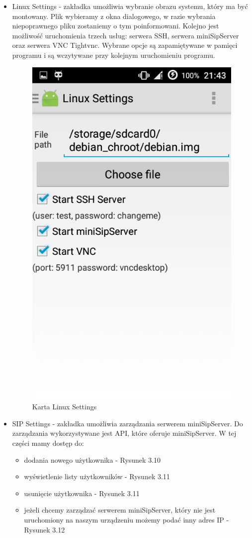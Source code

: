 \begin{itemize}
	\item Linux Settings - zakładka umożliwia wybranie obrazu systemu, który ma być montowany. Plik wybieramy z okna dialogowego, w razie wybrania niepoprawnego pliku zostaniemy o tym poinformowani. Kolejno jest możliwość uruchomienia trzech usług: serwera SSH, serwera miniSipServer oraz serwera VNC Tightvnc. Wybrane opcje są zapamiętywane w pamięci programu i są wczytywane przy kolejnym uruchomieniu programu.
	
    \begin{figure}[H]
\centering
\includegraphics[width=0.5\linewidth]{Screenshot_2015-09-20-21-43-44}
\caption{Karta Linux Settings}
\label{fig:Screenshot_2015-09-20-21-43-44}
\end{figure}
\newpage
\item SIP Settings - zakładka umożliwia zarządzania serwerem miniSipServer. Do zarządzania wykorzystywane jest API, które oferuje miniSipServer. W tej części mamy dostęp do:
\begin{itemize}
\item dodania nowego użytkownika - Rysunek 3.10
\item wyświetlenie listy użytkowników - Rysunek 3.11
\item usunięcie użytkownika - Rysunek 3.11
\item jeżeli chcemy zarządzać serwerem miniSipServer, który nie jest uruchomiony na naszym urządzeniu możemy podać inny adres IP - Rysunek 3.12


\end{itemize}
\end{itemize}
